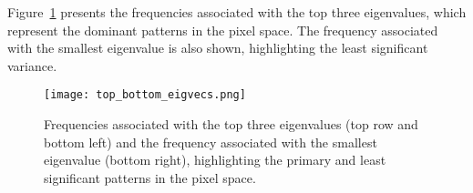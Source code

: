 \documentclass[12pt]{article}
\begin{document}
Figure~\ref*{fig:top_bottom_eigvecs} presents the frequencies associated with the top three eigenvalues, which represent
the dominant patterns in the pixel space. The frequency associated with the smallest eigenvalue is also shown,
highlighting the least significant variance.

\begin{figure}[htbp] 
	\centering
	\texttt{[image: top\_bottom\_eigvecs.png]} 
\caption{Frequencies associated with the top three eigenvalues (top row and
bottom left) and the frequency associated with the smallest eigenvalue (bottom
right), highlighting the primary and least significant patterns in the pixel
space.}
	\label{fig:top_bottom_eigvecs} 
\end{figure}
\end{document}
